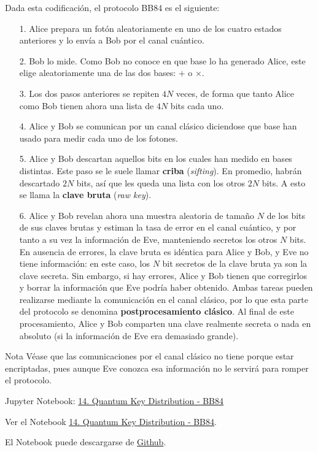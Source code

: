 \documentclass[a4paper,11pt]{book} %
\numberwithin{equation}{chapter}
\begin{document}
Dada esta codificación, el protocolo BB84 es el siguiente:
\begin{itemize}
	\item[1.] Alice prepara un fotón aleatoriamente en uno de los cuatro estados anteriores y lo envía a Bob por el canal cuántico. 
	\item[2.] Bob lo mide. Como Bob no conoce en que base lo ha generado Alice, este elige aleatoriamente una de las dos bases: $+$ o $\times$. 
	\item[3.] Los dos pasos anteriores se repiten $4N$ veces, de forma que tanto Alice como Bob tienen ahora una lista de $4N$ bits cada uno.
	\item[4.] Alice y Bob se comunican por un canal clásico diciendose que base han usado para medir cada uno de los fotones.
	\item[5.] Alice y Bob descartan aquellos bits en los cuales han medido en bases distintas. Este paso se le suele llamar \textbf{criba} (\textit{sifting}).  En promedio, habrán descartado $2N$ bits, así que les queda una lista con los otros $2N$ bits. A esto se llama la \textbf{clave bruta} (\textit{raw key}).
	\item[6.]  Alice y Bob revelan ahora una muestra aleatoria de tamaño $N$ de los bits de sus claves brutas y estiman la tasa de error en el canal cuántico, y por tanto a su vez la información de Eve, manteniendo secretos los otros $N$ bits. En ausencia de errores, la clave bruta es idéntica para Alice y Bob, y Eve no tiene información: en este caso, los $N$ bit secretos de la clave bruta ya son la clave secreta. Sin embargo, si hay errores, Alice y Bob tienen que corregirlos y borrar la información que Eve podría haber obtenido. Ambas tareas pueden realizarse mediante la comunicación en el canal clásico, por lo que esta parte del protocolo se denomina \textbf{postprocesamiento clásico}. Al final de este procesamiento, Alice y Bob comparten una clave realmente secreta o nada en absoluto (si la información de Eve era demasiado grande).
\end{itemize}


	\begin{mybox_blue}{Nota}
	Véase que las comunicaciones por el canal clásico no tiene porque estar encriptadas, pues aunque Eve conozca esa información no le servirá para romper el protocolo.
	\end{mybox_blue}


    \begin{mybox_orange}{Jupyter Notebook: \href{https://www.scbi.uma.es/web/wp-content/uploads/Jupyterbook/CICC_UMA/Notebooks/html/docs/Part_01/Chapter_14_QKD_myst.html}{14. Quantum Key Distribution - BB84}}
  
   Ver el Notebook \href{https://www.scbi.uma.es/web/wp-content/uploads/Jupyterbook/CICC_UMA/Notebooks/html/docs/Part_01/Chapter_14_QKD_myst.html}{14. Quantum Key Distribution - BB84}. 
    
  	El Notebook puede descargarse de \href{https://github.com/davidcb98/CICC_UMA/blob/master/Notebooks/Part_01/Chapter_14_QKD.ipynb}{Github}.
    \end{mybox_orange}
\end{document}
